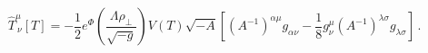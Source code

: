 \begin{equation}\label{hat_tachyon_stress}
{\hat{T}}^{\mu}_{\ \nu} [T] = - {\frac{1}{2}} e^{\Phi}
\left({\frac{\Lambda\rho_{\perp}}{\sqrt{-g}}} \right) V(T)
\sqrt{-A} \left[(A^{-1})^{\alpha\mu}g_{\alpha\nu} -
{\frac{1}{8}}g^{\mu}_{\nu}(A^{-1})^{\lambda\sigma}g_{\lambda\sigma}
\right] \, .
\end{equation}

